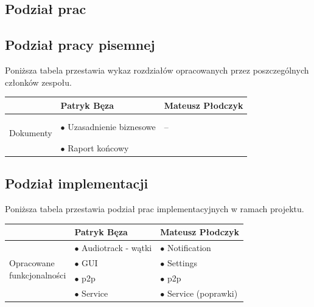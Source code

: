 \documentclass[a4paper,titlepage]{article}
\theoremstyle{break}
\begin{document}
\begin{appendices}

\section{Podział prac}
\subsection{Podział pracy pisemnej}

Poniższa tabela przestawia wykaz rozdziałów opracowanych przez poszczególnych członków zespołu.

\begin{table}[H]
\center
\begin{tabular}{p{2.5cm}|p{5cm}|p{5cm}}
& Patryk Bęza & Mateusz Płodczyk \\\hline\hline
\parbox{3cm}{\ \\Dokumenty} & $\bullet$ Uzasadnienie biznesowe & --\\
& $\bullet$ Raport końcowy & \\
\end{tabular}
\end{table}

\subsection{Podział implementacji}

Poniższa tabela przestawia podział prac implementacyjnych w ramach projektu.

\begin{table}[H]
\center
\begin{tabular}{p{2.5cm}|p{5cm}|p{5cm}}
& Patryk Bęza & Mateusz Płodczyk \\\hline\hline
\multirow{3}{*}{\parbox{3cm}{\ \\Opracowane \\funkcjonalności}} & $\bullet$ Audiotrack - wątki & $\bullet$ Notification\\
& $\bullet$ GUI & $\bullet$ Settings \\
& $\bullet$ p2p & $\bullet$ p2p \\
& $\bullet$ Service & $\bullet$ Service (poprawki) \\
\end{tabular}
\end{table}

\end{appendices}


\clearpage
\renewcommand\refname{Linki}


\end{document}

